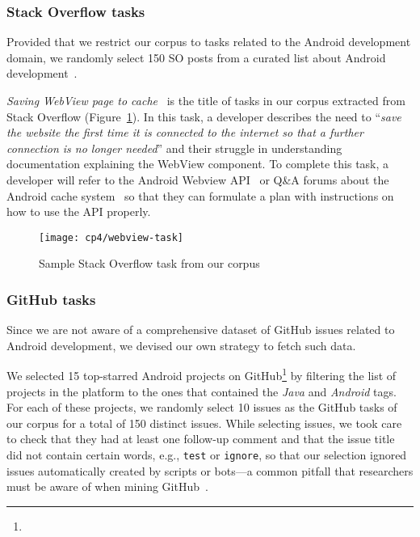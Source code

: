 \subsubsection{Stack Overflow tasks}

Provided that we restrict our corpus to tasks related to the Android development domain,
we randomly select 150 SO posts from a curated list about Android development~\cite{baltes2019-rep}.


\textit{Saving WebView page to cache}~\cite{so18607655}
is the title of tasks in our corpus extracted from Stack Overflow (Figure~\ref{fig:webview-task}). In this task, a developer describes the need
to
``\textit{save the website the first time it is connected to the internet so that a further connection is no longer needed}''
and their struggle in understanding documentation explaining the WebView component.
To complete this task, a developer will refer to the Android Webview API~\cite{apiWebView}
or Q\&A forums about the Android cache system~\cite{so8410830} so that they can 
formulate a plan with instructions on how to use the API properly.

\begin{figure}
    \centering
    \texttt{[image: cp4/webview-task]}
    \caption{Sample Stack Overflow task from our corpus}
    \label{fig:webview-task}
\end{figure}


\subsubsection{GitHub tasks}

Since we are not aware of a comprehensive dataset of GitHub issues related to Android development, we devised our own strategy to fetch such data.


We selected 15 top-starred Android projects on GitHub\footnote{} by filtering the list of projects in the platform to the ones that contained the \textit{Java} and \textit{Android} tags.
For each of these projects, we randomly select 10 issues as the GitHub tasks of our corpus for a total of 150 distinct issues.
While selecting issues, we took care to check that they had at least one follow-up comment and that the issue title did not contain certain words, e.g., {\small \texttt{test}} or {\small  \texttt{ignore}},
so that our selection ignored issues automatically created by scripts or bots---a common pitfall that researchers must be aware of when mining GitHub~\cite{kalliamvakou2014}.




